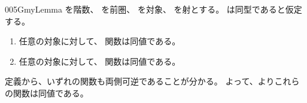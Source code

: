 \documentclass[index]{subfiles}
\begin{document}
\begin{myBlock}{005G}{myLemma}
  を階数、
  を前圏、
  を対象、
  を射とする。
  は同型であると仮定する。
  \begin{enumerate}
  \item 任意の対象に対して、
    関数は同値である。
  \item 任意の対象に対して、
    関数は同値である。
  \end{enumerate}
\end{myBlock}
\begin{myProof}
  定義から、いずれの関数も両側可逆であることが分かる。
  よって、よりこれらの関数は同値である。
\end{myProof}
\end{document}
